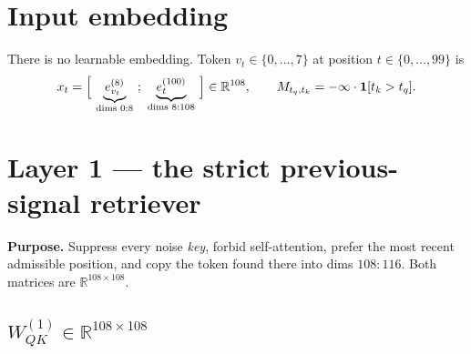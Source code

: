 \documentclass[11pt]{article}
\newcommand{\R}{\mathbb{R}}
\newcommand{\Wqk}{W_{QK}}
\begin{document}
\section{Input embedding}

There is no learnable embedding. Token $v_t\in\{0,\dots,7\}$ at position $t\in\{0,\dots,99\}$ is
\begin{equation}
x_t=\Bigl[\ \underbrace{e^{(8)}_{v_t}}_{\text{dims }0:8}\ ;\
\underbrace{e^{(100)}_{t}}_{\text{dims }8:108}\ \Bigr]\in\R^{108},
\qquad
M_{t_q,t_k}=-\infty\cdot\bm{1}[t_k>t_q].
\end{equation}

\section{Layer 1 --- the strict previous-signal retriever}

\textbf{Purpose.} Suppress every noise \emph{key}, forbid self-attention, prefer the most recent
admissible position, and copy the token found there into dims $108{:}116$.
Both matrices are $\R^{108\times108}$.

\subsection{$\Wqk^{(1)}\in\R^{108\times108}$}
\end{document}
